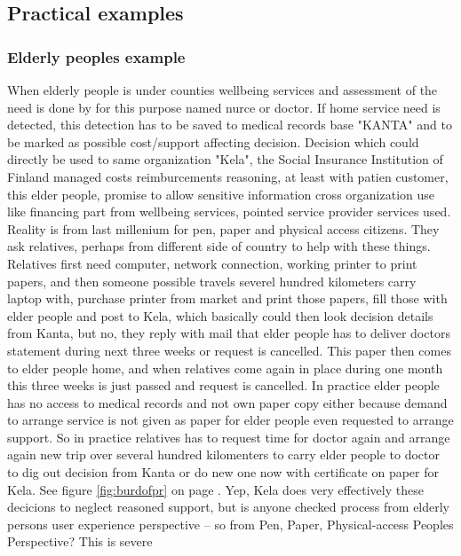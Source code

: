 \subsection{Practical examples}
\label{practical_examples}

\subsubsection{Elderly peoples example}
When elderly people is under counties wellbeing services and assessment of the
need is done by for this purpose named nurce or doctor. If home service need
is detected, this detection has to be saved to medical records base "KANTA"
and to be marked as possible cost/support affecting decision. Decision which
could directly be used to same organization "Kela", the Social Insurance
Institution of Finland managed costs reimburcements reasoning, at least with
patien customer, this elder people, promise to allow sensitive information
cross organization use like financing part from wellbeing services, pointed
service provider services used. Reality is from last millenium for pen, paper
and physical access citizens. They ask relatives, perhaps from different side
of country to help with these things. Relatives first need computer, network
connection, working printer to print papers, and then someone possible travels
severel hundred kilometers carry laptop with, purchase printer from market and
print those papers, fill those with elder people and post to Kela, which
basically could then look decision details from Kanta, but no, they reply with
mail that elder people has to deliver doctors statement during next three
weeks or request is cancelled. This paper then comes to elder people home, and
when relatives come again in place during one month this three weeks is just
passed and request is cancelled. In practice elder people has no access to
medical records and not own paper copy either because demand to arrange
service is not given as paper for elder people even requested to arrange
support. So in practice relatives has to request time for doctor again and
arrange again new trip over several hundred kilomenters to carry elder people
to doctor to dig out decision from Kanta or do new one now with certificate on
paper for Kela. See figure \ref{fig:burdofpr} on page \pageref{fig:burdofpr}.
Yep, Kela does very effectively these decicions to neglect reasoned support,
but is anyone checked process from elderly persons user experience perspective
-- so from Pen, Paper, Physical-access Peoples Perspective? This is severe
